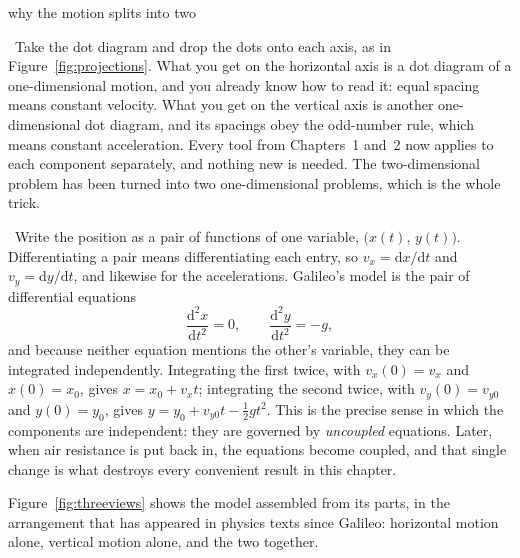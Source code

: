 \documentclass[11pt,twoside,openany]{book}
\newcommand{\dd}{\mathrm{d}}
\newcommand{\dderiv}[2]{\frac{\dd^2 #1}{\dd #2^2}}
\newcommand{\viewtag}[3]{\fcolorbox{#2}{#3}{\footnotesize\textbf{\textcolor{#2}{#1}}}}
\newcommand{\elemtag}{\viewtag{Elementary}{elemcol}{elempale}}
\newcommand{\calctag}{\viewtag{Calculus}{calccol}{calcpale}}
\newcommand{\elem}{\par\medskip\noindent\elemtag\ }
\newcommand{\calc}{\par\medskip\noindent\calctag\ }
\begin{document}
\begin{twoviews}{why the motion splits into two}
\elem Take the dot diagram and drop the dots onto each axis, as in Figure~\ref{fig:projections}. What you get on the horizontal axis is a dot diagram of a one-dimensional motion, and you already know how to read it: equal spacing means constant velocity. What you get on the vertical axis is another one-dimensional dot diagram, and its spacings obey the odd-number rule, which means constant acceleration. Every tool from Chapters~1 and~2 now applies to each component separately, and nothing new is needed. The two-dimensional problem has been turned into two one-dimensional problems, which is the whole trick.

\calc Write the position as a pair of functions of one variable, $\big(x(t),\,y(t)\big)$. Differentiating a pair means differentiating each entry, so $v_x = \dd x/\dd t$ and $v_y = \dd y/\dd t$, and likewise for the accelerations. Galileo's model is the pair of differential equations
\[
\dderiv{x}{t} = 0, \qquad \dderiv{y}{t} = -g,
\]
and because neither equation mentions the other's variable, they can be integrated independently. Integrating the first twice, with $v_x(0) = v_x$ and $x(0) = x_0$, gives $x = x_0 + v_x t$; integrating the second twice, with $v_y(0) = v_{y0}$ and $y(0) = y_0$, gives $y = y_0 + v_{y0}t - \tfrac12 g t^2$. This is the precise sense in which the components are independent: they are governed by \emph{uncoupled} equations. Later, when air resistance is put back in, the equations become coupled, and that single change is what destroys every convenient result in this chapter.
\end{twoviews}

Figure~\ref{fig:threeviews} shows the model assembled from its parts, in the arrangement that has appeared in physics texts since Galileo: horizontal motion alone, vertical motion alone, and the two together.
\end{document}
